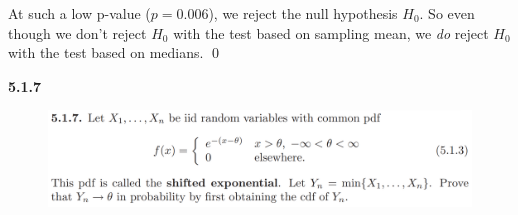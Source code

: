 \documentclass{book}
\theoremstyle{definition}
\begin{document}
At such a low p-value ($p = 0.006$), we reject the null hypothesis $H_0$. So even though we don't reject $H_0$ with the test based on sampling mean, we \textit{do} reject $H_0$ with the test based on medians. \qed


















\newpage




\noindent \textbf{5.1.7}


\begin{figure}[!htb]
	\includegraphics[scale=0.25]{517}
\end{figure}
\end{document}
